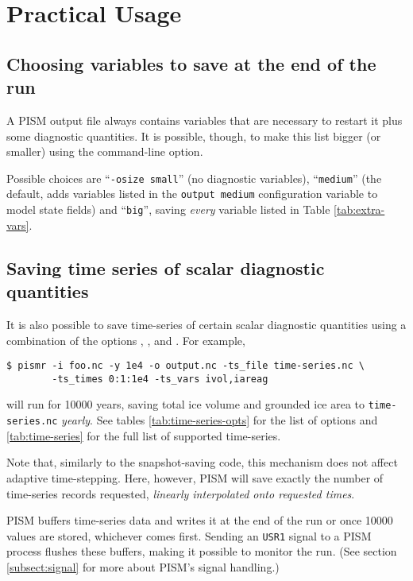 
\section{Practical Usage}
\label{sec:practical-usage}

\subsection{Choosing variables to save at the end of the run}
\label{sec:output-size}

A PISM output file always contains variables that are necessary to restart it
plus some diagnostic quantities. It is possible, though, to make this list
bigger (or smaller) using the  command-line option.

Possible choices are ``\texttt{-o\und size small}'' (no diagnostic variables),
``\texttt{medium}'' (the default, adds variables listed in the \texttt{output\und
  medium} configuration variable to model state fields) and ``\texttt{big}'',
saving \emph{every} variable listed in Table \ref{tab:extra-vars}.

\subsection{Saving time series of scalar diagnostic quantities}
\label{sec:saving-time-series}
 It is also possible to save time-series of certain scalar diagnostic quantities using a combination of the options , , and .  For example,
\begin{verbatim}
$ pismr -i foo.nc -y 1e4 -o output.nc -ts_file time-series.nc \
        -ts_times 0:1:1e4 -ts_vars ivol,iareag
\end{verbatim} %
will run for 10000 years, saving total ice volume and grounded ice area to \texttt{time-series.nc} \emph{yearly}. See tables \ref{tab:time-series-opts} for the list of options and \ref{tab:time-series} for the full list of supported time-series.

Note that, similarly to the snapshot-saving code, this mechanism does not affect adaptive time-stepping.  Here, however, PISM will save exactly the number of time-series records requested, \emph{linearly interpolated onto requested times}.

PISM buffers time-series data and writes it at the end of the run or once 10000 values are stored, whichever comes first. Sending an \texttt{USR1} signal to a PISM process flushes these buffers, making it possible to monitor the run. (See section \ref{subsect:signal} for more about PISM's signal handling.)

